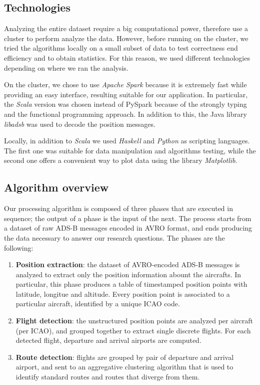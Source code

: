\documentclass{vldb}
\begin{document}
\subsection{Technologies}

Analyzing the entire dataset require a big computational power, therefore use a
cluster to perform analyze the data. However, before running on the cluster, we
tried the algorithms locally on a small subset of data to test correctness end
efficiency and to obtain statistics. For this reason, we used different
technologies depending on where we ran the analysis.

On the cluster, we chose to use \textit{Apache Spark} because it is extremely
fast while providing an easy interface, resulting suitable for our application.
In particular, the \textit{Scala} version was chosen instead of PySpark because
of the strongly typing and the functional programming approach. In addition to
this, the Java library \textit{libadsb} was used to decode the position
messages.

Locally, in addition to \textit{Scala} we used \textit{Haskell} and
\textit{Python} as scripting languages. The first one was suitable for data
manipulation and algorithms testing, while the second one offers a convenient
way to plot data using the library \textit{Matplotlib}.

\subsection{Algorithm overview}

Our processing algorithm is composed of three phases that are executed in
sequence; the output of a phase is the input of the next. The process starts
from a dataset of raw ADS-B messages encoded in AVRO format, and ends producing
the data necessary to answer our research questions. The phases are the
following:

\begin{enumerate}
  \item \textbf{Position extraction}: the dataset of AVRO-encoded ADS-B messages
  is analyzed to extract only the position information abount the aircrafts. In
  particular, this phase produces a table of timestamped position points with
  latitude, longitue and altitude. Every position point is associated to a
  particular aircraft, identified by a unique ICAO code.
  \item \textbf{Flight detection}: the unstructured position points are analyzed
  per aircraft (per ICAO), and grouped together to extract single discrete
  flights. For each detected flight, departure and arrival airports are
  computed.
  \item \textbf{Route detection}: flights are grouped by pair of departure and
  arrival airport, and sent to an aggregative clustering algorithm that is used
  to identify standard routes and routes that diverge from them.
\end{enumerate}
\end{document}
